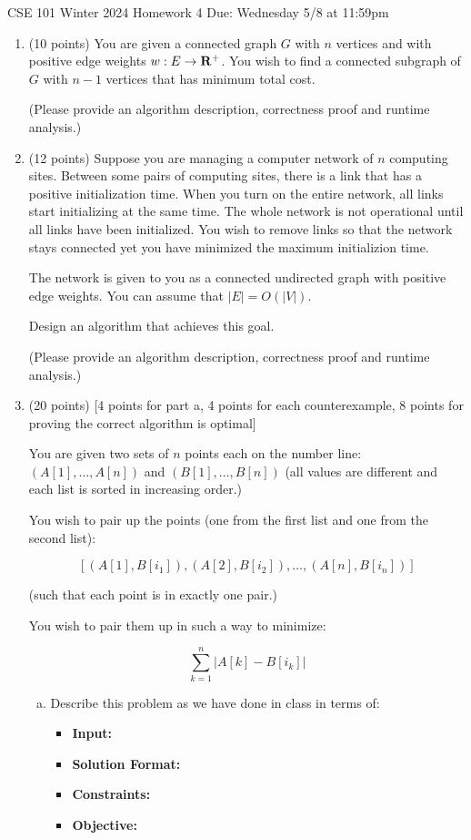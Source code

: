 \documentclass[10pt,letterpaper,unboxed,cm]{article}
\begin{document}
\hfill{CSE 101 Winter 2024}
\hfill{Homework 4 }
\hfill{Due: Wednesday 5/8 at 11:59pm}






\begin{enumerate}

\item (10 points)
You are given a connected graph $G$ with $n$ vertices and with positive edge weights $w:E\to {\bf R}^+$. You wish to find a connected subgraph of $G$ with $n-1$ vertices that has minimum total cost.

(Please provide an algorithm description, correctness proof and runtime analysis.)


\item (12 points)
Suppose you are managing a computer network of $n$ computing sites. Between some pairs of computing sites, there is a link that has a positive initialization time. When you turn on the entire network, all links start initializing at the same time. The whole network is not operational until all links have been initialized. You wish to remove links so that the network stays connected yet you have minimized the maximum initializion time.

The network is given to you as a connected undirected graph with positive edge weights. You can assume that $|E|=O(|V|)$.

Design an algorithm that achieves this goal.

(Please provide an algorithm description, correctness proof and runtime analysis.)

\item
(20 points) [4 points for part a, 4 points for each counterexample, 8 points for proving the correct algorithm is optimal]

You are given two sets of $n$ points each on the number line: $(A[1],\dots, A[n])$ and $(B[1],\dots,B[n])$ (all values are different and each list is sorted in increasing order.)

You wish to pair up the points (one from the first list and one from the second list):

 $$[(A[1],B[i_1]), (A[2],B[i_2]),\dots, (A[n], B[i_n])]$$ 
 
 (such that each point is in exactly one pair.)

You wish to pair them up in such a way to minimize:

$$\sum_{k=1}^n |A[k] - B[i_k]|$$

\begin{enumerate}[a)]
\item
Describe this problem as we have done in class in terms of:
\begin{itemize}
\item
{\bf Input:}
\item
{\bf Solution Format:}
\item
{\bf Constraints:}
\item
{\bf Objective:} 
\end{itemize}


\end{enumerate}
\end{enumerate}
\end{document}
